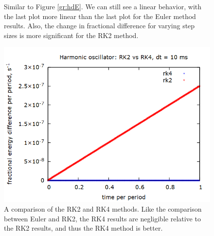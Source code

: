 \documentclass[aps,prl,twocolumn,superscriptaddress]{revtex4-1}
\begin{document}
\begin{figure}[htbp]
\begin{center}
  		\caption{Similar to Figure \ref{gr:hdE}. We can still see a linear behavior, with the last plot more linear than the last plot for the Euler method results. Also, the change in fractional difference for varying step sizes is more significant for the RK2 method.}
  		\label{gr:rk2dE}
 	\end{center}
\end{figure}

\begin{figure}[htbp]
  	\begin{center}
 		\includegraphics[scale=0.3]{2v4.png}
  		\caption{A comparison of the RK2 and RK4 methods. Like the comparison between Euler and RK2, the RK4 results are negligible relative to the RK2 results, and thus the RK4 method is better.}
  		\label{gr:2v4}
 	\end{center}
\end{figure}
\end{document}
